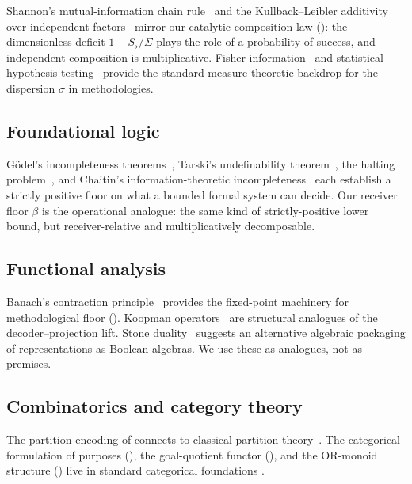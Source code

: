 \documentclass[11pt,twocolumn,a4paper]{article}
\newcommand{\Sfloor}{S_{\flat}}
\begin{document}
Shannon's mutual-information chain rule~\cite{shannon1948,
coverthomas2006} and the Kullback--Leibler additivity over independent
factors~\cite{kullback1951} mirror our catalytic composition law
(): the dimensionless deficit $1-\Sfloor/\Sigma$
plays the role of a probability of success, and independent
composition is multiplicative. Fisher information~\cite{fisher1925}
and statistical hypothesis testing~\cite{lehmann2006,wasserman2004}
provide the standard measure-theoretic backdrop for the dispersion
$\sigma$ in methodologies.

\subsection{Foundational logic}

Gödel's incompleteness theorems~\cite{godel1931},
Tarski's undefinability theorem~\cite{tarski1933}, the halting
problem~\cite{turing1936,church1936}, and Chaitin's information-theoretic
incompleteness~\cite{chaitin1974} each establish a strictly positive
floor on what a bounded formal system can decide. Our receiver floor
$\beta$ is the operational analogue: the same kind of
strictly-positive lower bound, but receiver-relative and
multiplicatively decomposable.

\subsection{Functional analysis}

Banach's contraction principle~\cite{banach1922} provides the
fixed-point machinery for methodological floor ().
Koopman operators~\cite{koopman1931} are structural analogues of the
decoder--projection lift. Stone duality~\cite{stone1936} suggests an
alternative algebraic packaging of representations as Boolean
algebras. We use these as analogues, not as premises.

\subsection{Combinatorics and category theory}

The partition encoding of  connects to classical
partition theory~\cite{andrews1976,stanley2011}. The categorical
formulation of purposes (), the goal-quotient
functor (), and the OR-monoid structure
() live in standard categorical foundations
\cite{maclane1998,awodey2010,barrwells1990}.
\end{document}
